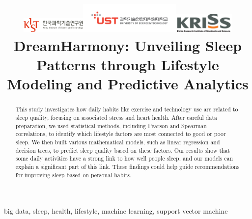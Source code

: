 \documentclass[conference]{IEEEtran}
\begin{document}

\title{\includegraphics[width=3.2cm]{images/kist.png}\includegraphics[width=5cm]{images/ust.png}\includegraphics[width=3cm]{images/kriss.png} \linebreak DreamHarmony: Unveiling Sleep Patterns through Lifestyle Modeling and Predictive Analytics
}


\author{
}
\maketitle

\begin{abstract}
    This study investigates how daily habits like exercise and technology use are related to sleep quality, focusing on associated stress and heart health. After careful data preparation, we used statistical methods, including Pearson\cite{pearson} and Spearman correlations\cite{spearman}, to identify which lifestyle factors are most connected to good or poor sleep. We then built various mathematical models, such as linear regression and decision trees, to predict sleep quality based on these factors. Our results show that some daily activities have a strong link to how well people sleep, and our models can explain a significant part of this link. These findings could help guide recommendations for improving sleep based on personal habits.
\end{abstract}

\begin{IEEEkeywords}
    big data, sleep, health, lifestyle, machine learning, support vector machine
\end{IEEEkeywords}
\end{document}
